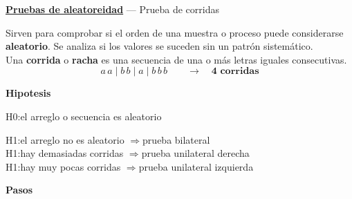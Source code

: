 \documentclass[10pt,a4paper]{article}
\begin{document}
{\large\bfseries\uline{Pruebas de aleatoreidad}} --- Prueba de corridas
\vspace{4pt}

Sirven para comprobar si el orden de una muestra o proceso puede considerarse \textbf{aleatorio}. Se analiza si los valores se suceden sin un patrón sistemático.\\
Una \textbf{corrida} o \textbf{racha} es una secuencia de una o más letras iguales consecutivas.
\[
a\,a \mid b\,b \mid a \mid b\,b\,b \qquad \longrightarrow \quad \textbf{4 corridas}
\]

\textbf{\large Hipotesis}

H0:el arreglo o secuencia es aleatorio

H1:el arreglo no es aleatorio $\Rightarrow$prueba bilateral\\
H1:hay demasiadas corridas $\Rightarrow$prueba unilateral derecha\\
H1:hay muy pocas corridas $\Rightarrow$prueba unilateral izquierda

\textbf{\large Pasos}
\end{document}
